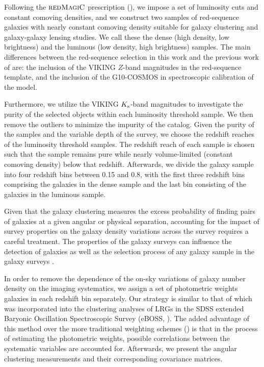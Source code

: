 \documentclass[fleqn,usenatbib,useAMS]{mnras}
\begin{document}
Following the $\textsc{redMagiC}$ prescription (\citealt{rozo2016}), we impose a set of luminosity cuts and constant comoving densities, and we construct two samples of red-sequence galaxies with nearly constant comoving density suitable for galaxy clustering and galaxy-galaxy lensing studies. We call these the dense (high density, low brightness) and the luminous (low density, high brightness) samples. The main differences between the red-sequence selection in this work and the previous work of \citet{vakili2019} are: the inclusion of the VIKING $Z$-band magnitudes in the red-sequence template, and the inclusion of the G10-COSMOS in spectroscopic calibration of the model. %

Furthermore, we utilize the VIKING $K_{\rm s}$-band magnitudes to investigate the purity of the selected objects within each luminosity threshold sample. We then remove the outliers to minimize the impurity of the catalog. Given the purity of the samples and the variable depth of the survey, we choose the redshift reaches of the luminosity threshold samples. The redshift reach of each sample is chosen such that the sample remains pure while nearly volume-limited (constant comoving density) below that redshift. Afterwards, we divide the galaxy sample into four redshift bins between 0.15 and 0.8, with the first three redshift bins comprising the galaxies in the dense sample and the last bin consisting of the galaxies in the luminous sample. 

Given that the galaxy clustering measures the excess probability of finding pairs of galaxies at a given angular or physical separation, accounting for the impact of survey properties on the galaxy density variations across the survey requires a careful treatment. The properties of the galaxy surveys can influence the detection of galaxies as well as the selection process of any galaxy sample in the galaxy surveys \citep[e.g.][]{alam2017,kwan2017,ross2017,elvin2017,crocce2019,kalus2019}. 


In order to remove the dependence of the on-sky variations of galaxy number density on the imaging systematics, we assign a set of photometric weights galaxies in each redshift bin separately. Our strategy is similar to that of \citet{bautista2018sdss, icaza2020clustering} which was incorporated into the clustering analyses of LRGs in the SDSS extended Baryonic Oscillation Spectroscopic Survey (eBOSS, \citealt{dawson2016}). The added advantage of this method over the more traditional weighting schemes (\citealt{ross2017clustering, crocce2019dark}) is that in the process of estimating the photometric weights, possible correlations between the systematic variables are accounted for. Afterwards, we present the angular clustering measurements and their corresponding covariance matrices.
\end{document}
